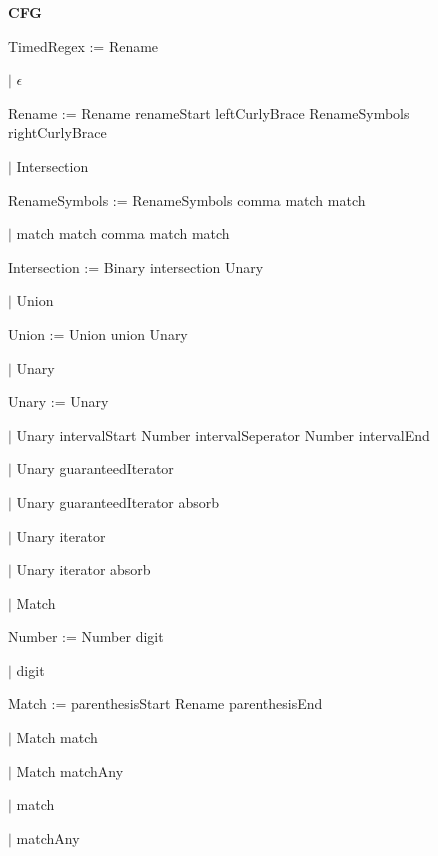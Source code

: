
\textbf{CFG}

TimedRegex := Rename

\qquad	$\mid$ $\epsilon$

Rename := Rename renameStart leftCurlyBrace RenameSymbols rightCurlyBrace

\qquad $\mid$ Intersection

RenameSymbols := RenameSymbols comma match match

\qquad $\mid$ match match comma match match

Intersection := Binary intersection Unary

\qquad $\mid$ Union

Union := Union union Unary

\qquad $\mid$ Unary

Unary := Unary

\qquad $\mid$ Unary intervalStart Number intervalSeperator Number intervalEnd

\qquad $\mid$ Unary guaranteedIterator

\qquad $\mid$ Unary guaranteedIterator absorb

\qquad $\mid$ Unary iterator

\qquad $\mid$ Unary iterator absorb

\qquad $\mid$ Match

Number := Number digit

\qquad $\mid$ digit

Match := parenthesisStart Rename parenthesisEnd

\qquad $\mid$ Match match

\qquad $\mid$ Match matchAny

\qquad $\mid$ match

\qquad $\mid$ matchAny

